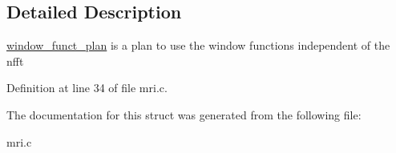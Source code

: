 \subsection{Detailed Description}
\hyperlink{structwindow__funct__plan}{window\_\-funct\_\-plan} is a plan to use the window functions independent of the nfft 

Definition at line 34 of file mri.c.

The documentation for this struct was generated from the following file:\begin{CompactItemize}
\item 
mri.c\end{CompactItemize}
